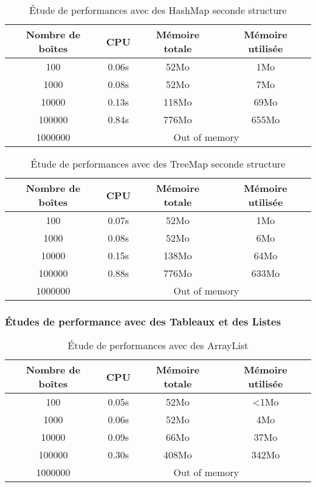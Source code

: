 \begin{table}[htbp]
  \centering
\begin{tabular}{|c|c|c|c|}
\hline
Nombre de boîtes & CPU & Mémoire totale & Mémoire utilisée\\
\hline
100 & 0.06s & 52Mo & 1Mo\\
\hline
1000 & 0.08s & 52Mo & 7Mo\\
\hline
10000 & 0.13s & 118Mo & 69Mo\\
\hline
100000 & 0.84s & 776Mo & 655Mo\\
\hline
1000000 & \multicolumn{3}{|c|}{Out of memory}\\
\hline
\end{tabular}
\caption{Étude de performances avec des HashMap seconde structure}
\label{tab:hashmap3}
\end{table}



\begin{table}[htbp]
  \centering
\begin{tabular}{|c|c|c|c|}
\hline
Nombre de boîtes & CPU & Mémoire totale & Mémoire utilisée\\
\hline
100 & 0.07s & 52Mo & 1Mo\\
\hline
1000 & 0.08s & 52Mo & 6Mo\\
\hline
10000 & 0.15s & 138Mo & 64Mo\\
\hline
100000 & 0.88s & 776Mo & 633Mo\\
\hline
1000000 & \multicolumn{3}{|c|}{Out of memory}\\
\hline
\end{tabular}
\caption{Étude de performances avec des TreeMap seconde structure}
\label{tab:treemap2}
\end{table}

\subsubsection{Études de performance avec des Tableaux et des Listes}

\begin{table}[h]
  \centering
\begin{tabular}{|c|c|c|c|}
\hline
Nombre de boîtes & CPU & Mémoire totale & Mémoire utilisée\\
\hline
100 & 0.05s & 52Mo & <1Mo\\
\hline
1000 & 0.06s & 52Mo & 4Mo\\
\hline
10000 & 0.09s & 66Mo & 37Mo\\
\hline
100000 & 0.30s & 408Mo & 342Mo\\
\hline
1000000 & \multicolumn{3}{|c|}{Out of memory}\\
\hline
\end{tabular}
\caption{Étude de performances avec des ArrayList}
 \label{tab:arraylist}
\end{table}

